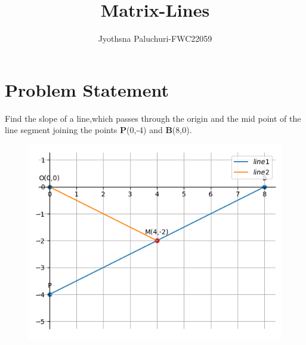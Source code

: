 \documentclass[journal,12pt,twocolumn]{IEEEtran}
\title{
Matrix-Lines
}
\author{Jyothsna Paluchuri-FWC22059\\}
\let\vec\mathbf
\begin{document}
\maketitle
\tableofcontents
\bigskip
\section{Problem Statement}
\fi
Find the slope of a line,which passes through the origin and the mid point of the line segment joining the points $\vec{P}$(0,-4) and $\vec{B}$(8,0).
	\begin{figure}[!ht]
		\centering
 \includegraphics[width=\columnwidth]{chapters/11/10/1/5/figs/line.png}
		\caption{}
		\label{fig:11/10/1/5}
  	\end{figure}
	\\
	\solution
\iffalse
\end{document}
